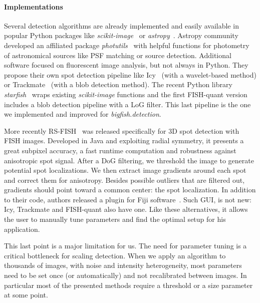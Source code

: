 \paragraph{Implementations}

Several detection algorithms are already implemented and easily available in popular Python packages like \emph{scikit-image}~\cite{walt_scikit-image_2014} or \emph{astropy}~\cite{astropy_2018}.
Astropy community developed an affiliated package \emph{photutils}~\cite{larry_bradley_2020_4044744} with helpful functions for photometry of astronomical sources like \ac{PSF} matching or source detection.
Additional software focused on fluorescent image analysis, but not always in Python.
They propose their own spot detection pipeline like Icy~\cite{de_chaumont_icy_2012} (with a wavelet-based method) or Trackmate~\cite{ershov_trackmate_2022} (with a blob detection method).
The recent Python library \emph{starfish}~\cite{perkel_starfish_2019} wraps existing \emph{scikit-image} functions and the first FISH-quant version~\cite{mueller_fish-quant_2013} includes a blob detection pipeline with a \ac{LoG} filter.
This last pipeline is the one we implemented and improved for \emph{bigfish.detection}.

More recently RS-FISH~\cite{bahry_rs-fish_2021} was released specifically for 3D spot detection with \ac{FISH} images.
Developed in Java and exploiting radial symmetry, it presents a great subpixel accuracy, a fast runtime computation and robustness against anisotropic spot signal.
After a \ac{DoG} filtering, we threshold the image to generate potential spot localizations.
We then extract image gradients around each spot and correct them for anisotropy.
Besides possible outliers that are filtered out, gradients should point toward a common center: the spot localization.
In addition to their code, authors released a plugin for Fiji software~\cite{schindelin_fiji_2012}.
Such \ac{GUI}, is not new: Icy, Trackmate and FISH-quant also have one.
Like these alternatives, it allows the user to manually tune parameters and find the optimal setup for his application.

This last point is a major limitation for us.
The need for parameter tuning is a critical bottleneck for scaling detection.
When we apply an algorithm to thousands of images, with noise and intensity heterogeneity, most parameters need to be set once (or automatically) and not recalibrated between images.
In particular most of the presented methods require a threshold or a size parameter at some point.

